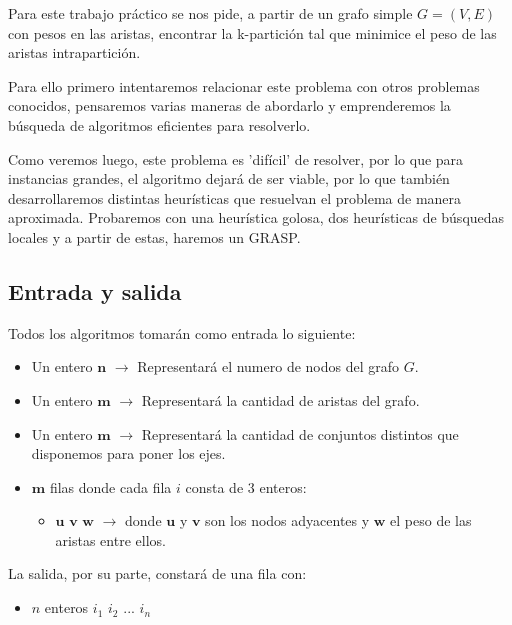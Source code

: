 Para este trabajo práctico se nos pide, a partir de un grafo simple $G=(V,E)$ con pesos en las aristas, encontrar la k-partición tal que minimice el peso de las aristas intrapartición.

Para ello primero intentaremos relacionar este problema con otros problemas conocidos, pensaremos varias maneras de abordarlo y emprenderemos la búsqueda de algoritmos eficientes para resolverlo.

Como veremos luego, este problema es 'difícil' de resolver, por lo que para instancias grandes, el algoritmo dejará de ser viable, por lo que también desarrollaremos distintas heurísticas que resuelvan el problema de manera aproximada. Probaremos con una heurística golosa, dos heurísticas de búsquedas locales y a partir de estas, haremos un GRASP.

\subsection{Entrada y salida}

Todos los algoritmos tomarán como entrada lo siguiente:

\begin{itemize}
	\item Un entero $\textbf{n}$ $\rightarrow$ Representará el numero de nodos del grafo $G$.

	\item Un entero $\textbf{m}$ $\rightarrow$ Representará la cantidad de aristas del grafo.

	\item Un entero $\textbf{m}$ $\rightarrow$ Representará la cantidad de conjuntos distintos que disponemos para poner los ejes.

	\item $\textbf{m}$ filas donde cada fila $i$ consta de $3$ enteros:
	\begin{itemize}
		\item $\textbf{u v w}$ $ \rightarrow $ donde $\textbf{u}$ y $\textbf{v}$ son los nodos adyacentes y $\textbf{w}$ el peso de las aristas entre ellos.
	\end{itemize}
\end{itemize}

La salida, por su parte, constar\'a de una fila con:

\begin{itemize}

	\item $n$ enteros $i_1$ $i_2$ $...$ $i_n$

\end{itemize}

